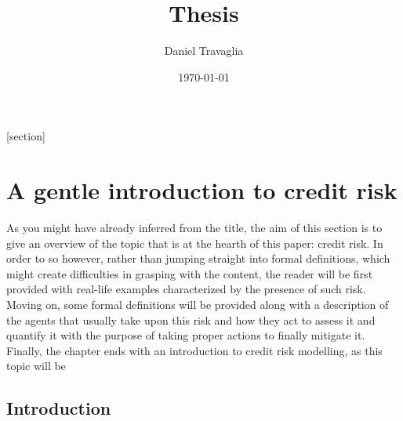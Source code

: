 \documentclass[a4paper,12pt]{article}
\begin{document}

    \setlength{\abovedisplayshortskip}{6pt}
    \setlength{\belowdisplayshortskip}{24pt}
    
    \setlength\parskip{0.5\baselineskip}

    [section]
    \newenvironment{definition}[1][]{\refstepcounter{definition}\par\medskip
        \noindent \textbf{Definition #1:} \rmfamily}{\medskip}
    
    \title{Thesis}
    \author{Daniel Travaglia}
    \date{\today}
    \maketitle

    \pagebreak

    \pagebreak
    
    \section{A gentle introduction to credit risk}

    As you might have already inferred from the title, the aim of this section is to give an overview
    of the topic that is at the hearth of this paper: credit risk. In order to so however, rather than jumping 
    straight into formal definitions, which might create difficulties in grasping with the content, the reader 
    will be first provided with real-life examples characterized by the presence of such risk. Moving on, some
    formal definitions will be provided along with a description of the agents that usually take upon this risk 
    and how they act to assess it and quantify it with the purpose of taking proper actions to finally mitigate it. 
    Finally, the chapter ends with an introduction to credit risk modelling, as this topic will be  

    \subsection[]{Introduction}
            
\end{document}
